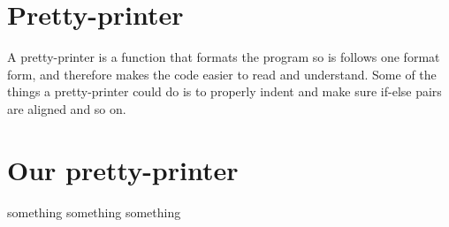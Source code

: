\section{Pretty-printer}
A pretty-printer is a function that formats the program so is follows one format form, and therefore makes the code easier to read and understand. Some of the things a pretty-printer could do is to properly indent and make sure if-else pairs are aligned and so on. 

\section{Our pretty-printer}
something something something